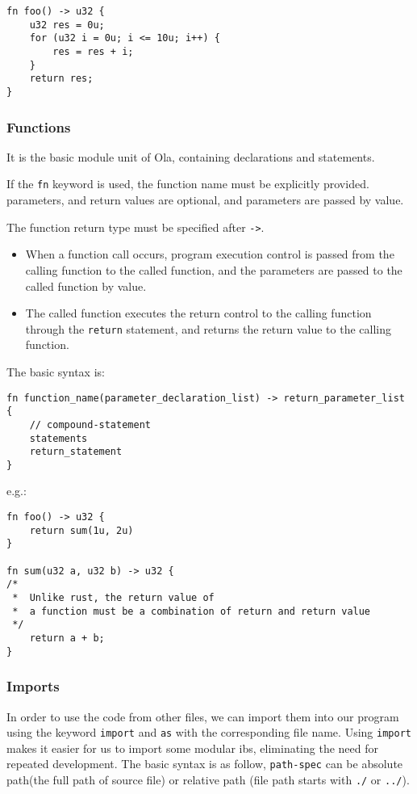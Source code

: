 \begin{lstlisting}
fn foo() -> u32 {
    u32 res = 0u;
    for (u32 i = 0u; i <= 10u; i++) {
        res = res + i;
    }
    return res;
}
\end{lstlisting}

\subsubsection{Functions}

It is the basic module unit of Ola, containing declarations and statements.

If the \verb|fn| keyword is used, the function name must be explicitly provided. parameters, and return values are optional, and parameters are passed by value.

The function return type must be specified after \verb|->|.

\begin{itemize}
    \item When a function call occurs, program execution control is passed from the calling function to the called function, and the parameters are passed to the called function by value. 
    \item The called function executes the return control to the calling function through the \verb|return| statement, and returns the return value to the calling function.
\end{itemize}

The basic syntax is:

\begin{lstlisting}
fn function_name(parameter_declaration_list) -> return_parameter_list {
    // compound-statement
    statements
    return_statement
}
\end{lstlisting}

e.g.:

\begin{lstlisting}
fn foo() -> u32 {
    return sum(1u, 2u)
}

fn sum(u32 a, u32 b) -> u32 {
/* 
 *  Unlike rust, the return value of 
 *  a function must be a combination of return and return value
 */
    return a + b;
}
\end{lstlisting}

\subsubsection{Imports}

In order to use the code from other files, we can import them into our program using the keyword \verb|import| and \verb|as| with the corresponding file name.
Using \verb|import| makes it easier for us to import some modular ibs, eliminating the need for repeated development.
The basic syntax is as follow, \verb|path-spec| can be absolute path(the full path of source file) or relative path (file path starts with \verb|./| or \verb|../|).

